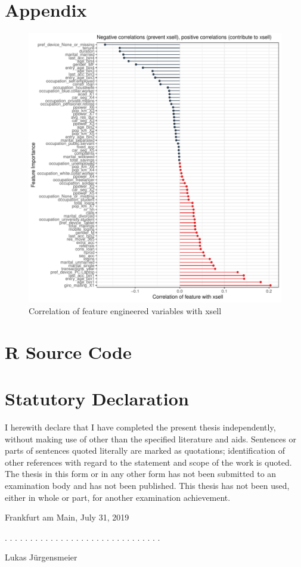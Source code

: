 \documentclass[12pt,a4paper]{article}
\begin{document}
\clearpage
\appendix
\section{Appendix}
\begin{figure}[ht]
	\centering
  \includegraphics[scale=0.8]{figures/corrplot.pdf}
	\caption{Correlation of feature engineered variables with xsell}
	\label{fig_corr}
\end{figure}

\section{R Source Code}
%
%
%
%

\clearpage


\newpage
\thispagestyle{empty}
\section*{Statutory Declaration}\label{statutory-declaration}

I herewith declare that I have completed the present thesis independently, without making use of
other than the specified literature and aids. Sentences or parts of sentences quoted literally are
marked as quotations; identification of other references with regard to the statement and scope of
the work is quoted. The thesis in this form or in any other form has not been submitted to an examination body and has not been published.
This thesis has not been used, either in whole or part, for another examination achievement.

\vspace{1cm}

Frankfurt am Main, July 31, 2019
\vspace{2cm}

. . . . . . . . . . . . . . . . . . . . . . . . . . . . . . .
\vspace{0.1cm}

Lukas J\"urgensmeier
\end{document}

